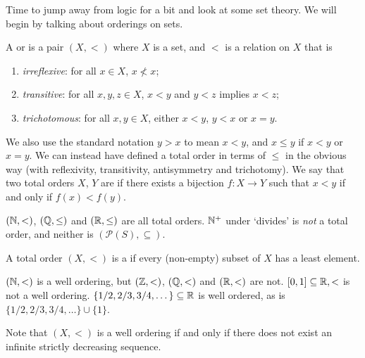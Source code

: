 \documentclass[a4paper]{scrartcl}
\begin{document}
Time to jump away from logic for a bit and look at some set theory. We will begin by talking about orderings on sets.

\begin{definition}
  A  or  is a pair $(X, <)$ where $X$ is a set, and $<$ is a relation on $X$ that is
  \begin{enumerate}[label=(\roman*)]
    \item \emph{irreflexive}: for all $x \in X$, $x \not< x$;
    \item \emph{transitive}: for all $x, y, z \in X$, $x < y$ and $y < z$ implies $x < z$;
    \item \emph{trichotomous}: for all $x, y \in X$, either $x < y$, $y < x$ or $x = y$. 
  \end{enumerate}
\end{definition}

We also use the standard notation $y > x$ to mean $x < y$, and $x \leq y$ if $x < y$ or $x = y$. We can instead have defined a total order in terms of $\leq$ in the obvious way (with reflexivity, transitivity, antisymmetry and trichotomy). We say that two total orders $X$, $Y$ are  if there exists a bijection $f: X \rightarrow Y$ such that $x < y$ if and only if $f(x) < f(y)$.

\begin{example}
  $(\mathbb{N}, <)$, $(\mathbb{Q}, \leq)$ and $(\mathbb{R}, \leq)$ are all total orders. $\mathbb{N}^+$ under `divides' is \emph{not} a total order, and neither is $(\mathcal{P}(S), \subseteq)$.
\end{example}

\begin{definition}
  A total order $(X, <)$ is a  if every (non-empty) subset of $X$ has a least element.
\end{definition}

\begin{example}
$(\mathbb{N}, <)$ is a well ordering, but $(\mathbb{Z}, <)$, $(\mathbb{Q}, <)$ and $(\mathbb{R}, <)$ are not. $[0, 1] \subseteq \mathbb{R}, <$ is not a well ordering. $\{1/2, 2/3, 3/4, \dots \} \subseteq \mathbb{R}$ is well ordered, as is $\{1/2, 2/3, 3/4, \dots \} \cup \{1\}$.
\end{example}

Note that $(X, <)$ is a well ordering if and only if there does not exist an infinite strictly decreasing sequence.
\end{document}
